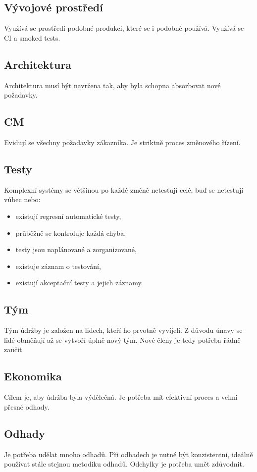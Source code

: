   \subsection{Vývojové prostředí}
    Využívá se prostředí podobné produkci, které se i podobně používá. Využívá se CI a smoked tests.

  \subsection{Architektura}
    Architektura musí být navržena tak, aby byla schopna absorbovat nové požadavky.

  \subsection{CM}
    Evidují se všechny požadavky zákazníka. Je striktně proces změnového řízení.

  \subsection{Testy}
    Komplexní systémy se většinou po každé změně netestují celé, buď se netestují vůbec nebo:
    \begin{itemize}
      \item existují regresní automatické testy,
      \item průběžně se kontroluje každá chyba,
      \item testy jsou naplánované a zorganizované,
      \item existuje záznam o testování,
      \item existují akceptační testy a jejich záznamy.
    \end{itemize}

    \subsection{Tým}
      Tým údržby je založen na lidech, kteří ho prvotně vyvíjeli. Z důvodu únavy se lidé obměňují až se vytvoří úplně nový tým.
      Nové členy je tedy potřeba řádně zaučit.

    \subsection{Ekonomika}
      Cílem je, aby údržba byla výdělečná. Je potřeba mít efektivní proces a velmi přesné odhady.

    \subsection{Odhady}
      Je potřeba udělat mnoho odhadů. Při odhadech je nutné být konzistentní, ideálně používat stále stejnou metodiku odhadů.
      Odchylky je potřeba umět zdůvodnit.

